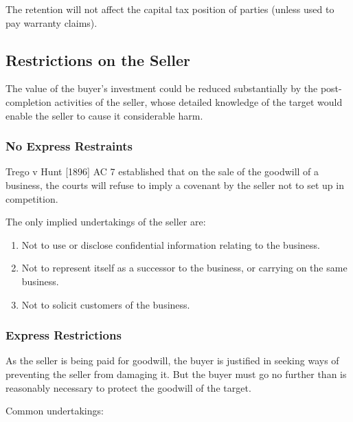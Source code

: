 \documentclass[
]{article}
\providecommand{\tightlist}{%
  \setlength{\itemsep}{0pt}\setlength{\parskip}{0pt}}
\begin{document}
The retention will not affect the capital tax position of parties
(unless used to pay warranty claims).

\hypertarget{restrictions-on-the-seller}{%
\subsection{Restrictions on the
Seller}\label{restrictions-on-the-seller}}

The value of the buyer's investment could be reduced substantially by
the post-completion activities of the seller, whose detailed knowledge
of the target would enable the seller to cause it considerable harm.

\hypertarget{no-express-restraints}{%
\subsubsection{No Express Restraints}\label{no-express-restraints}}

Trego v Hunt {[}1896{]} AC 7 established that on the sale of the
goodwill of a business, the courts will refuse to imply a covenant by
the seller not to set up in competition.

The only implied undertakings of the seller are:

\begin{enumerate}
\tightlist
\item
  Not to use or disclose confidential information relating to the
  business.
\item
  Not to represent itself as a successor to the business, or carrying on
  the same business.
\item
  Not to solicit customers of the business.
\end{enumerate}

\hypertarget{express-restrictions}{%
\subsubsection{Express Restrictions}\label{express-restrictions}}

As the seller is being paid for goodwill, the buyer is justified in
seeking ways of preventing the seller from damaging it. But the buyer
must go no further than is reasonably necessary to protect the goodwill
of the target.

Common undertakings:
\end{document}
